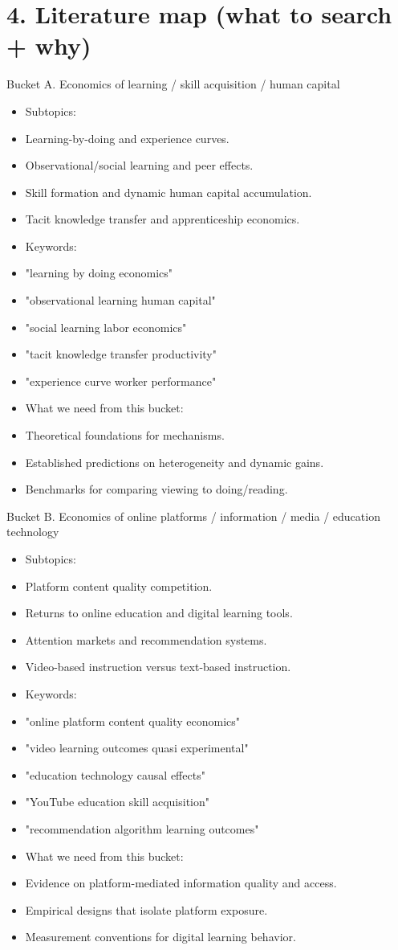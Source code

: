 \documentclass[11pt]{article}
\begin{document}
\section*{4. Literature map (what to search + why)}
Bucket A. Economics of learning / skill acquisition / human capital\\
\begin{itemize}
\item Subtopics:
\item Learning-by-doing and experience curves.
\item Observational/social learning and peer effects.
\item Skill formation and dynamic human capital accumulation.
\item Tacit knowledge transfer and apprenticeship economics.
\item Keywords:
\item "learning by doing economics"
\item "observational learning human capital"
\item "social learning labor economics"
\item "tacit knowledge transfer productivity"
\item "experience curve worker performance"
\item What we need from this bucket:
\item Theoretical foundations for mechanisms.
\item Established predictions on heterogeneity and dynamic gains.
\item Benchmarks for comparing viewing to doing/reading.
\end{itemize}

Bucket B. Economics of online platforms / information / media / education technology\\
\begin{itemize}
\item Subtopics:
\item Platform content quality competition.
\item Returns to online education and digital learning tools.
\item Attention markets and recommendation systems.
\item Video-based instruction versus text-based instruction.
\item Keywords:
\item "online platform content quality economics"
\item "video learning outcomes quasi experimental"
\item "education technology causal effects"
\item "YouTube education skill acquisition"
\item "recommendation algorithm learning outcomes"
\item What we need from this bucket:
\item Evidence on platform-mediated information quality and access.
\item Empirical designs that isolate platform exposure.
\item Measurement conventions for digital learning behavior.
\end{itemize}
\end{document}
